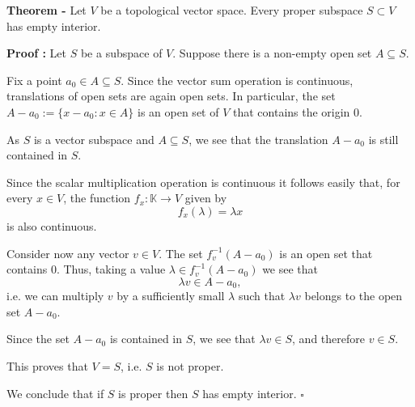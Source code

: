 \documentclass[12pt]{article}
\begin{document}
{\bf Theorem -} Let $V$ be a topological vector space. Every proper subspace $S \subset V$ has empty interior.

{\bf Proof :} Let $S$ be a subspace of $V$. Suppose there is a non-empty open set $A \subseteq S$.

Fix a point $a_0 \in A \subseteq S$. Since the vector sum operation is continuous, translations of open sets are again open sets. In particular, the set $A - a_0 := \{x-a_0 : x \in A\}$ is an open set of $V$ that contains the origin $0$.

As $S$ is a vector subspace and $A \subseteq S$, we see that the translation $A-a_0$ is still contained in $S$.

Since the scalar multiplication operation is continuous it follows easily that, for every $x \in V$, the function $f_x: \mathbb{K} \longrightarrow V$ given by
\begin{displaymath}
f_x (\lambda) = \lambda x
\end{displaymath}
is also continuous.

Consider now any vector $v \in V$. The set $f_v^{-1}(A-a_0)$ is an open set that contains $0$. Thus, taking a value $\lambda \in f_v^{-1}(A-a_0)$ we see that
\begin{displaymath}
\lambda v \in A-a_0 ,
\end{displaymath}
i.e. we can multiply $v$ by a sufficiently small $\lambda$ such that $\lambda v$ belongs to the open set $A - a_0$.

Since the set $A- a_0$ is contained in $S$, we see that $\lambda v \in S$, and therefore $v \in S$.

This proves that $V=S$, i.e. $S$ is not proper.

We conclude that if $S$ is proper then $S$ has empty interior. $\square$
\end{document}
